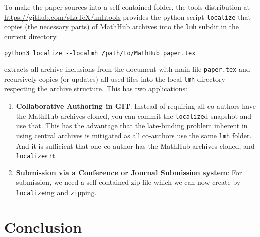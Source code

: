 \documentclass{llncs}
\begin{document}
To make the paper sources into a self-contained folder, the \sTeX tools distribution at
\url{https://github.com/sLaTeX/lmhtools} provides the python script \texttt{localize} that
copies (the necessary parts) of MathHub archives into the \texttt{lmh} subdir in the
current directory.
\begin{verbatim}
python3 localize --localmh /path/to/MathHub paper.tex
\end{verbatim}
extracts all archive inclusions from the \sTeX document with main file \verb|paper.tex|
and recursively copies (or updates) all used files into the local \verb|lmh| directory
respecting the archive structure. This has two applications:
\begin{enumerate}
\item \textbf{Collaborative Authoring in GIT}: Instead of requiring all co-authors have
  the MathHub archives cloned, you can commit the \texttt{localize}d snapshot and use
  that. This has the advantage that the late-binding problem inherent in using central
  archives is mitigated as all co-authors use the same \texttt{lmh} folder. And it is
  sufficient that one co-author has the MathHub archives cloned, and \texttt{localize}s
  it.
\item \textbf{Submission via a Conference or Journal Submission system}: For submission,
  we need a self-contained zip file which we can now create by \texttt{localize}ing and
  \texttt{zip}ping.
\end{enumerate}

\section{Conclusion}\label{sec:conc}
\printbibliography
\end{document}
